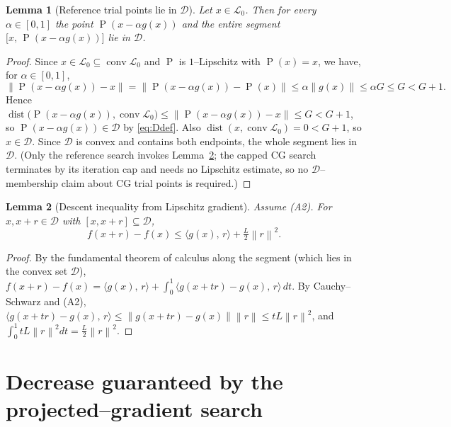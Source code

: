 \documentclass[12pt]{article}
\newtheorem{lemma}{Lemma}
\DeclareMathOperator{\proj}{P}
\newcommand{\norm}[1]{\left\lVert #1 \right\rVert}
\newcommand{\inner}[2]{\langle #1,\, #2\rangle}
\begin{document}
\begin{lemma}[Reference trial points lie in $\mathcal D$]\label{lem:Dtrial}
Let $x\in\mathcal L_0$. Then for every $\alpha\in[0,1]$ the point
$\proj(x-\alpha g(x))$ and the entire segment
$\big[x,\,\proj(x-\alpha g(x))\big]$ lie in $\mathcal D$.
\end{lemma}

\begin{proof}
Since $x\in\mathcal L_0\subseteq\operatorname{conv}\mathcal L_0$ and $\proj$ is
$1$--Lipschitz with $\proj(x)=x$, we have, for $\alpha\in[0,1]$,
\[
\norm{\proj(x-\alpha g(x))-x}=\norm{\proj(x-\alpha g(x))-\proj(x)}
\le\alpha\norm{g(x)}\le\alpha G\le G<G+1 .
\]
Hence $\operatorname{dist}\!\big(\proj(x-\alpha g(x)),
\operatorname{conv}\mathcal L_0\big)\le\norm{\proj(x-\alpha g(x))-x}\le G<G+1$,
so $\proj(x-\alpha g(x))\in\mathcal D$ by \eqref{eq:Ddef}. Also
$\operatorname{dist}(x,\operatorname{conv}\mathcal L_0)=0<G+1$, so
$x\in\mathcal D$. Since $\mathcal D$ is convex and contains both endpoints, the
whole segment lies in $\mathcal D$. (Only the reference search invokes
Lemma~\ref{lem:taylor}; the capped CG search terminates by its iteration cap and
needs no Lipschitz estimate, so no $\mathcal D$--membership claim about CG trial
points is required.)
\end{proof}

\begin{lemma}[Descent inequality from Lipschitz gradient]\label{lem:taylor}
Assume (A2). For $x,x+r\in\mathcal D$ with $[x,x+r]\subseteq\mathcal D$,
\begin{equation}\label{eq:desclemma}
f(x+r)-f(x)\le\inner{g(x)}{r}+\tfrac{L}{2}\norm{r}^2 .
\end{equation}
\end{lemma}

\begin{proof}
By the fundamental theorem of calculus along the segment (which lies in the
convex set $\mathcal D$),
$f(x+r)-f(x)=\inner{g(x)}{r}+\int_0^1\inner{g(x+tr)-g(x)}{r}\,dt$. By
Cauchy--Schwarz and (A2),
$\inner{g(x+tr)-g(x)}{r}\le\norm{g(x+tr)-g(x)}\norm{r}\le tL\norm{r}^2$, and
$\int_0^1 tL\norm{r}^2dt=\tfrac{L}{2}\norm{r}^2$.
\end{proof}

\section{Decrease guaranteed by the projected--gradient search}
\end{document}
